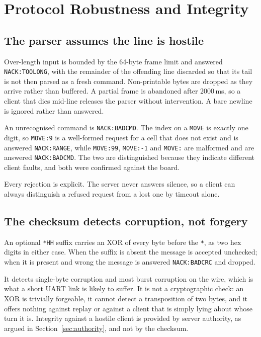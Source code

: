 \section{Protocol Robustness and Integrity}
\label{sec:robust}

\subsection{The parser assumes the line is hostile}
Over-length input is bounded by the 64-byte frame limit and answered
\texttt{NACK:TOOLONG}, with the remainder of the offending line discarded so
that its tail is not then parsed as a fresh command. Non-printable bytes are
dropped as they arrive rather than buffered. A partial frame is abandoned after
2000\,ms, so a client that dies mid-line releases the parser without
intervention. A bare newline is ignored rather than answered.

An unrecognised command is \texttt{NACK:BADCMD}. The index on a \texttt{MOVE}
is exactly one digit, so \texttt{MOVE:9} is a well-formed request for a cell
that does not exist and is answered \texttt{NACK:RANGE}, while
\texttt{MOVE:99}, \texttt{MOVE:-1} and \texttt{MOVE:} are malformed and are
answered \texttt{NACK:BADCMD}. The two are distinguished because they indicate
different client faults, and both were confirmed against the board.

Every rejection is explicit. The server never answers silence, so a client can
always distinguish a refused request from a lost one by timeout alone.

\subsection{The checksum detects corruption, not forgery}
An optional \texttt{*HH} suffix carries an XOR of every byte before the
\texttt{*}, as two hex digits in either case. When the suffix is absent the
message is accepted unchecked; when it is present and wrong the message is
answered \texttt{NACK:BADCRC} and dropped.

It detects single-byte corruption and most burst corruption on the wire, which
is what a short UART link is likely to suffer. It is not a cryptographic check:
an XOR is trivially forgeable, it cannot detect a transposition of two bytes,
and it offers nothing against replay or against a client that is simply lying
about whose turn it is. Integrity against a hostile client is provided by server
authority, as argued in Section~\ref{sec:authority}, and not by the checksum.

